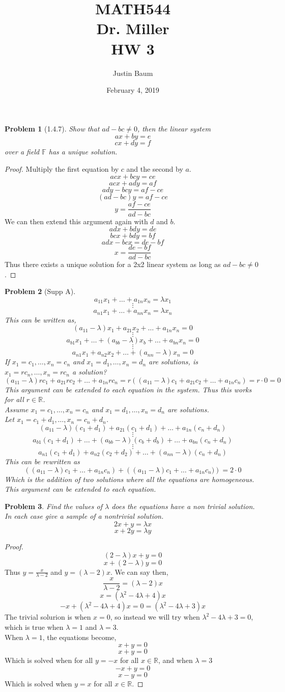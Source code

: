 \documentclass[12pt]{article}   %
\title{MATH544 \\ Dr. Miller \\ HW 3}
\author{Justin Baum}
\date{February 4, 2019}
\newcommand{\R}{\mathbb{R}} %
\newcommand{\F}{\mathbb{F}} %
\newtheorem{problem}{Problem}
\begin{document}
\maketitle

\begin{problem}[1.4.7]
Show that $ad-bc\neq 0$, then the linear system
\[ax+by=e\]
\[cx+dy=f\]
over a field $\F$ has a unique solution.
\end{problem}
\begin{proof}
Multiply the first equation by $c$ and the second by $a$.
\[acx+bcy=ce\]
\[acx+ady=af\]
\[ady-bcy=af-ce\]
\[(ad-bc)y=af-ce\]
\[y=\frac{af-ce}{ad-bc}\]
We can then extend this argument again with $d$ and $b$.
\[adx+bdy=de\]
\[bcx+bdy=bf\]
\[adx-bcx=de-bf\]
\[x=\frac{de-bf}{ad-bc}\]
Thus there exists a unique solution for a 2x2 linear system as long as $ad-bc\neq0$.
\end{proof}
\begin{problem}[Supp A]
\[a_{11}x_1+\dots+a_{1n}x_n=\lambda x_1\]
\[\vdots\]
\[a_{n1}x_1+\dots+a_{nn}x_n=\lambda x_n\]
This can be written as,
\[(a_{11}-\lambda)x_1+a_{21}x_2+\dots+a_{1n}x_n=0\]
\[\vdots\]
\[a_{b1}x_1+\dots+(a_{bb}-\lambda)x_b+\dots+a_{bn}x_n=0\]
\[\vdots\]
\[a_{n1}x_1+a_{n2}x_2+\dots+(a_{nn}-\lambda)x_n=0\]
If $x_1=c_1,\dots,x_n=c_n$ and $x_1=d_1,\dots,x_n=d_n$ are solutions, is $x_1=rc_n,\dots,x_n=rc_n$ a solution?
\[(a_{11}-\lambda)rc_1+a_{21}rc_2+\dots+a_{1n}rc_n=r((a_{11}-\lambda)c_1+a_{21}c_2+\dots+a_{1n}c_n)=r\cdot 0=0\]
This argument can be extended to each equation in the system. Thus this works for all $r\in \R$. \\
Assume $x_1=c_1,\dots,x_n=c_n$ and $x_1=d_1,\dots,x_n=d_n$ are solutions.\\
Let $x_1=c_1+d_1,\dots, x_n=c_n+d_n$.
\[(a_{11}-\lambda)(c_1+d_1)+a_{21}(c_1+d_1)+\dots+a_{1n}(c_n+d_n)\]
\[\vdots\]
\[a_{b1}(c_1+d_1)+\dots+(a_{bb}-\lambda)(c_b+d_b)+\dots+a_{bn}(c_n+d_n)\]
\[\vdots\]
\[a_{n1}(c_1+d_1)+a_{n2}(c_2+d_2)+\dots+(a_{nn}-\lambda)(c_n+d_n)\]
This can be rewritten as
\[\left ((a_11-\lambda)c_1+\dots+a_{1n}c_n\right )+\left ((a_11-\lambda)c_1+\dots+a_{1n}c_n)\right )=2\cdot0\]
Which is the addition of two solutions where all the equations are homogeneous. This argument can be extended to each equation.
\end{problem}

\begin{problem}
Find the values of $\lambda$ does the equations have a non trivial solution. In each case give a sample of a nontrivial solution.
\[2x+y=\lambda x\]
\[x+2y=\lambda y\]
\end{problem}
\begin{proof}
\[(2-\lambda)x+y=0\]
\[x+(2-\lambda)y=0\]
Thus $y=\frac{x}{\lambda-2}$ and $y=(\lambda-2)x$.
We can say then,
\[\frac{x}{\lambda-2}=(\lambda-2)x\]
\[x=(\lambda^2-4\lambda+4)x\]
\[-x+(\lambda^2-4\lambda+4)x=0=(\lambda^2-4\lambda+3)x\]
The trivial solurion is when $x=0$, so instead we will try when $\lambda^2-4\lambda+3=0$, which is true when $\lambda=1$ and $\lambda=3$.\\
When $\lambda=1$, the equations become, 
\[x+y=0\]
\[x+y=0\]
Which is solved when for all $y=-x$ for all $x      \in\R$, and when $\lambda=3$
\[-x+y=0\]
\[x-y=0\]
Which is solved when $y=x$ for all $x\in\R$.
\end{proof}
\end{document}
